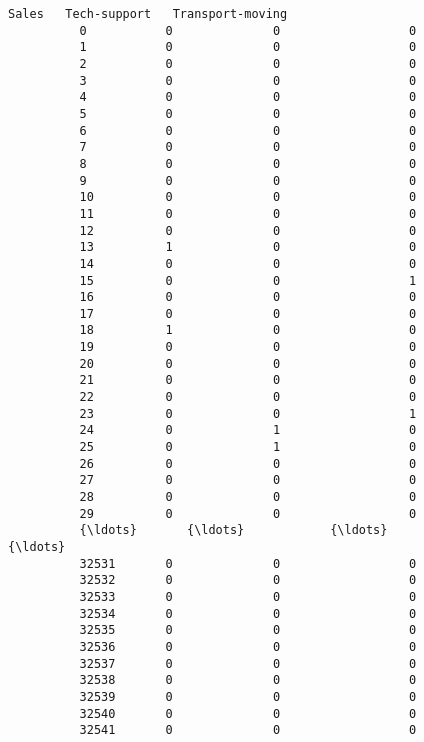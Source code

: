 \documentclass[11pt]{article}
\begin{document}
\begin{Verbatim}[commandchars=\\\{\}]
                  Sales   Tech-support   Transport-moving  
          0           0              0                  0  
          1           0              0                  0  
          2           0              0                  0  
          3           0              0                  0  
          4           0              0                  0  
          5           0              0                  0  
          6           0              0                  0  
          7           0              0                  0  
          8           0              0                  0  
          9           0              0                  0  
          10          0              0                  0  
          11          0              0                  0  
          12          0              0                  0  
          13          1              0                  0  
          14          0              0                  0  
          15          0              0                  1  
          16          0              0                  0  
          17          0              0                  0  
          18          1              0                  0  
          19          0              0                  0  
          20          0              0                  0  
          21          0              0                  0  
          22          0              0                  0  
          23          0              0                  1  
          24          0              1                  0  
          25          0              1                  0  
          26          0              0                  0  
          27          0              0                  0  
          28          0              0                  0  
          29          0              0                  0  
          {\ldots}       {\ldots}            {\ldots}                {\ldots}  
          32531       0              0                  0  
          32532       0              0                  0  
          32533       0              0                  0  
          32534       0              0                  0  
          32535       0              0                  0  
          32536       0              0                  0  
          32537       0              0                  0  
          32538       0              0                  0  
          32539       0              0                  0  
          32540       0              0                  0  
          32541       0              0                  0  

\end{Verbatim}
\end{document}
